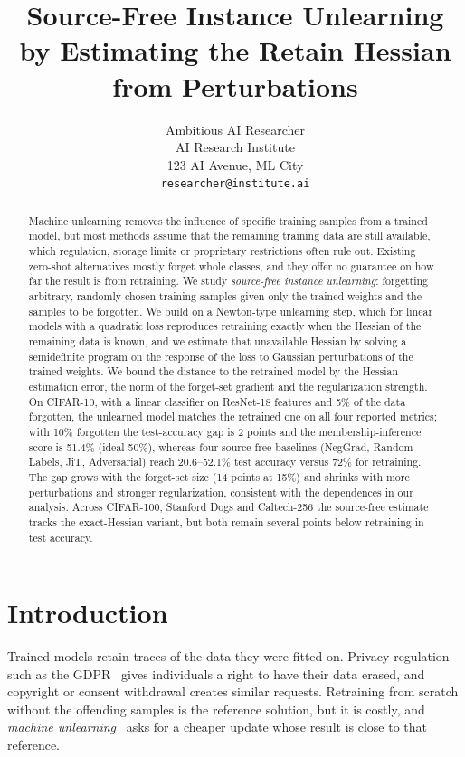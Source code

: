 \documentclass[10pt,twocolumn,letterpaper]{article}
\title{Source-Free Instance Unlearning by Estimating the Retain Hessian from Perturbations}
\author{Ambitious AI Researcher\\
AI Research Institute\\
123 AI Avenue, ML City\\
{\tt\small researcher@institute.ai}
}
\begin{document}
\maketitle

\begin{abstract}
Machine unlearning removes the influence of specific training samples from a trained model, but most methods assume that the remaining training data are still available, which regulation, storage limits or proprietary restrictions often rule out.
Existing zero-shot alternatives mostly forget whole classes, and they offer no guarantee on how far the result is from retraining.
We study \emph{source-free instance unlearning}: forgetting arbitrary, randomly chosen training samples given only the trained weights and the samples to be forgotten.
We build on a Newton-type unlearning step, which for linear models with a quadratic loss reproduces retraining exactly when the Hessian of the remaining data is known, and we estimate that unavailable Hessian by solving a semidefinite program on the response of the loss to Gaussian perturbations of the trained weights.
We bound the distance to the retrained model by the Hessian estimation error, the norm of the forget-set gradient and the regularization strength.
On CIFAR-10, with a linear classifier on ResNet-18 features and 5\% of the data forgotten, the unlearned model matches the retrained one on all four reported metrics; with 10\% forgotten the test-accuracy gap is 2 points and the membership-inference score is 51.4\% (ideal 50\%), whereas four source-free baselines (NegGrad, Random Labels, JiT, Adversarial) reach 20.6--52.1\% test accuracy versus 72\% for retraining.
The gap grows with the forget-set size (14 points at 15\%) and shrinks with more perturbations and stronger regularization, consistent with the dependences in our analysis.
Across CIFAR-100, Stanford Dogs and Caltech-256 the source-free estimate tracks the exact-Hessian variant, but both remain several points below retraining in test accuracy.
\end{abstract}

\section{Introduction}
\label{sec:intro}
Trained models retain traces of the data they were fitted on.
Privacy regulation such as the GDPR~\cite{gdpr2016} gives individuals a right to have their data erased, and copyright or consent withdrawal creates similar requests.
Retraining from scratch without the offending samples is the reference solution, but it is costly, and \emph{machine unlearning}~\cite{cao2015,bourtoule2021,nguyen2022survey} asks for a cheaper update whose result is close to that reference.
\end{document}
